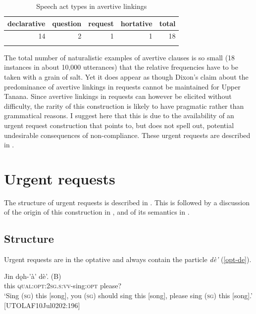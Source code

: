\documentclass[output=paper,colorlinks,citecolor=brown]{langscibook}
\begin{document}
\begin{table}
\caption{Speech act types in avertive linkings}
\label{tab:avertive-freq}
 \begin{tabular}{rrrrr}
  \lsptoprule
  declarative & question  & request & hortative & total \\   \midrule
  14 & 2 & 1 & 1 & 18\\
  \lspbottomrule
 \end{tabular}
\end{table}

The total number of naturalistic examples of avertive clauses is so small (18 instances in about 10,000 utterances) that the relative frequencies have to be taken with a grain of salt. Yet it does appear as though Dixon's claim about the predominance of avertive linkings in requests cannot be maintained for Upper Tanana. Since avertive linkings in requests can however be elicited without difficulty, the rarity of this construction is likely to have pragmatic rather than grammatical reasons. I suggest here that this is due to the availability of an urgent request construction that points to, but does not spell out, potential undesirable consequences of non-compliance. These urgent requests are described in .

\section{Urgent requests}
\label{section:apprehensional}

The structure of urgent requests is described in . This is followed by a discussion of the origin of this construction in , and of its semantics in .

\subsection{Structure}
\label{subsection:urgent-structure}

Urgent requests are in the optative and always contain the particle  \textit{dè'} (\ref{opt-de}). 

\begin{exe}
\ex \label{opt-de}
\gll Jin dǫh-'à' dè'. \textnormal{(B)}\\
this \textsc{qual:opt:2sg.s:vv}-sing:\textsc{opt} please? \\
\glt `Sing (\textsc{sg}) this [song], you (\textsc{sg}) should sing this [song], please sing (\textsc{sg}) this [song].' \hfill [UTOLAF10Jul0202:196]
\end{exe}
\end{document}
